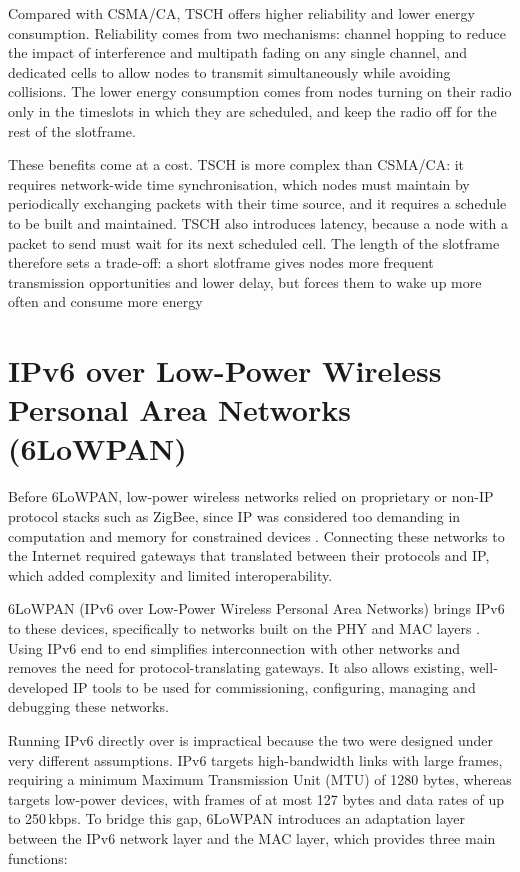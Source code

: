 Compared with CSMA/CA, TSCH offers higher reliability and lower
energy consumption. Reliability comes from two mechanisms: channel
hopping to reduce the impact of interference and multipath fading on
any single channel, and dedicated cells to allow nodes to transmit
simultaneously while avoiding collisions. The lower
energy consumption comes from nodes turning on their radio only in the
timeslots in which they are scheduled, and keep the radio off for the rest
of the slotframe.

These benefits come at a cost. TSCH is more complex than CSMA/CA: it
requires network-wide time synchronisation, which nodes must maintain
by periodically exchanging packets with their time source, and it
requires a schedule to be built and maintained. TSCH also introduces
latency, because a node with a packet to send must wait for its next
scheduled cell. The length of the slotframe therefore sets a
trade-off: a short slotframe gives nodes more frequent transmission
opportunities and lower delay, but forces them to wake up more often
and consume more energy

\section{IPv6 over Low-Power Wireless Personal Area Networks (6LoWPAN)}
Before 6LoWPAN, low-power wireless networks relied on proprietary or
non-IP protocol stacks such as ZigBee, since IP was considered too
demanding in computation and memory for constrained devices
\cite{culler20096lowpan}. Connecting these networks to the Internet
required gateways that translated between their protocols and IP,
which added complexity and limited interoperability.

6LoWPAN (IPv6 over Low-Power Wireless Personal Area Networks) brings
IPv6 to these devices, specifically to networks built on the
\ieeemac{} PHY and MAC layers \cite{rfc4944}. Using IPv6 end to end
simplifies interconnection with other networks and removes the need
for protocol-translating gateways. It also allows existing,
well-developed IP tools to be used for commissioning, configuring,
managing and debugging these networks.

Running IPv6 directly over \ieeemac{} is impractical because the two
were designed under very different assumptions. IPv6 targets
high-bandwidth links with large frames, requiring a minimum Maximum
Transmission Unit (MTU) of
1280 bytes, whereas \ieeemac{} targets low-power devices, with frames
of at most 127 bytes and data rates of up to 250\,kbps. To bridge
this gap, 6LoWPAN introduces an adaptation layer between the IPv6
network layer and the \ieeemac{} MAC layer, which provides three main
functions:

